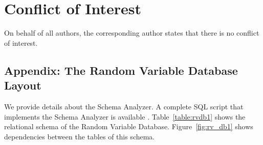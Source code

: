 
\section{Conflict of Interest}
On behalf of all authors, the corresponding author states that there is no conflict of interest.

\begin{appendix}

\section{Appendix: The Random Variable Database Layout} 
We provide details about the Schema Analyzer. A complete SQL script that implements the Schema Analyzer is available \cite{Schulte2015}. Table~\ref{table:rvdb1} shows the relational schema of the Random Variable Database. Figure~\ref{fig:rv_db1} shows dependencies between the tables of this schema. 

\begin{table}[htbp]
  \centering
  \caption{Schema for Random Variable Database}


\end{table}
\end{appendix}
